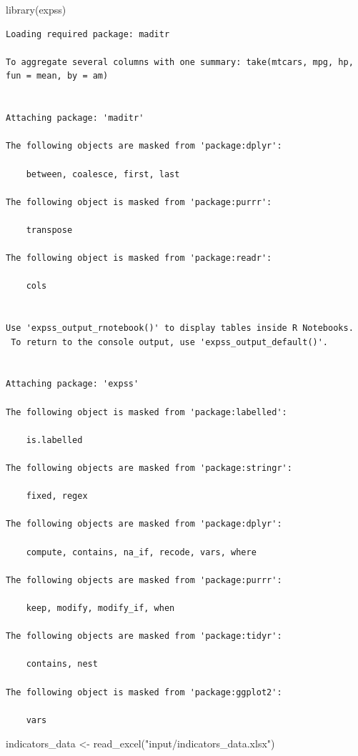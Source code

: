 \documentclass[
  letterpaper,
  DIV=11,
  numbers=noendperiod]{scrreprt}
\newenvironment{Shaded}{\begin{snugshade}}{\end{snugshade}}
\newcommand{\FunctionTok}[1]{\textcolor[rgb]{0.28,0.35,0.67}{#1}}
\newcommand{\NormalTok}[1]{\textcolor[rgb]{0.00,0.23,0.31}{#1}}
\newcommand{\OtherTok}[1]{\textcolor[rgb]{0.00,0.23,0.31}{#1}}
\newcommand{\StringTok}[1]{\textcolor[rgb]{0.13,0.47,0.30}{#1}}
\begin{document}
\begin{Shaded}
\begin{Highlighting}[]
\FunctionTok{library}\NormalTok{(expss)}
\end{Highlighting}
\end{Shaded}

\begin{verbatim}
Loading required package: maditr

To aggregate several columns with one summary: take(mtcars, mpg, hp, fun = mean, by = am)


Attaching package: 'maditr'

The following objects are masked from 'package:dplyr':

    between, coalesce, first, last

The following object is masked from 'package:purrr':

    transpose

The following object is masked from 'package:readr':

    cols


Use 'expss_output_rnotebook()' to display tables inside R Notebooks.
 To return to the console output, use 'expss_output_default()'.


Attaching package: 'expss'

The following object is masked from 'package:labelled':

    is.labelled

The following objects are masked from 'package:stringr':

    fixed, regex

The following objects are masked from 'package:dplyr':

    compute, contains, na_if, recode, vars, where

The following objects are masked from 'package:purrr':

    keep, modify, modify_if, when

The following objects are masked from 'package:tidyr':

    contains, nest

The following object is masked from 'package:ggplot2':

    vars
\end{verbatim}

\begin{Shaded}
\begin{Highlighting}[]
\NormalTok{indicators\_data }\OtherTok{\textless{}{-}} \FunctionTok{read\_excel}\NormalTok{(}\StringTok{"input/indicators\_data.xlsx"}\NormalTok{)}
\end{Highlighting}
\end{Shaded}
\end{document}
